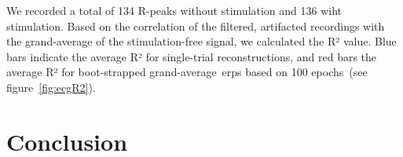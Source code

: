 \documentclass[a4paper]{article}
\newcommand{\figref}[1]{(see figure~\ref{#1})}
\begin{document}
We recorded a total of 134 R-peaks without stimulation and 136 wiht stimulation. Based on  the correlation of the filtered, artifacted recordings with the grand-average of the stimulation-free signal, we calculated the R² value. Blue bars indicate the average R² for single-trial reconstructions, and red bars the average R² for boot-strapped grand-average~\gls{erp}s based on 100 epochs~\figref{fig:ecgR2}.

\section{Conclusion}



\end{document}
